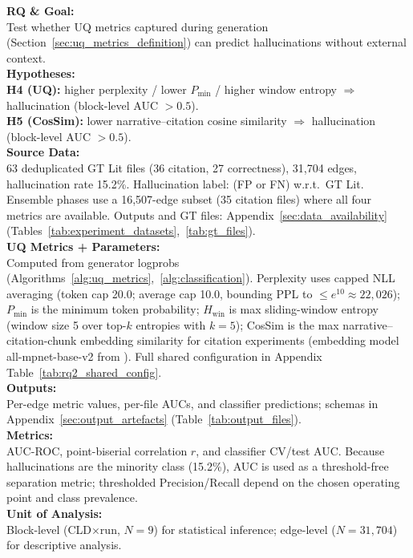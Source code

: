 \noindent\textbf{RQ \& Goal:}\\
Test whether UQ metrics captured during generation (Section~\ref{sec:uq_metrics_definition}) can predict hallucinations without external context.\\
\textbf{Hypotheses:}\\
\textbf{H4 (UQ):} higher perplexity / lower $P_{\min}$ / higher window entropy $\Rightarrow$ hallucination (block-level AUC $>0.5$).\\
\textbf{H5 (CosSim):} lower narrative--citation cosine similarity $\Rightarrow$ hallucination (block-level AUC $>0.5$).\\
\textbf{Source Data:}\\
63 deduplicated GT Lit files (36 citation, 27 correctness), 31{,}704 edges, hallucination rate 15.2\%. Hallucination label: (FP or FN) w.r.t.\ GT Lit. Ensemble phases use a 16{,}507-edge subset (35 citation files) where all four metrics are available. Outputs and GT files: Appendix~\ref{sec:data_availability} (Tables~\ref{tab:experiment_datasets},~\ref{tab:gt_files}).\\
\textbf{UQ Metrics + Parameters:}\\
Computed from generator logprobs (Algorithms~\ref{alg:uq_metrics},~\ref{alg:classification}). Perplexity uses capped NLL averaging (token cap 20.0; average cap 10.0, bounding PPL to $\le e^{10}\approx22{,}026$); $P_{\min}$ is the minimum token probability; $H_{\text{win}}$ is max sliding-window entropy (window size 5 over top-$k$ entropies with $k{=}5$); CosSim is the max narrative--citation-chunk embedding similarity for citation experiments (embedding model all-mpnet-base-v2 from \cite{muennighoff2023mteb}). Full shared configuration in Appendix Table~\ref{tab:rq2_shared_config}.\\
\textbf{Outputs:}\\
Per-edge metric values, per-file AUCs, and classifier predictions; schemas in Appendix~\ref{sec:output_artefacts} (Table~\ref{tab:output_files}).\\
\textbf{Metrics:}\\
AUC-ROC, point-biserial correlation $r$, and classifier CV/test AUC. Because hallucinations are the minority class (15.2\%), AUC is used as a threshold-free separation metric; thresholded Precision/Recall depend on the chosen operating point and class prevalence.\\
\textbf{Unit of Analysis:}\\
Block-level (CLD$\times$run, $N=9$) for statistical inference; edge-level ($N=31{,}704$) for descriptive analysis.\\
